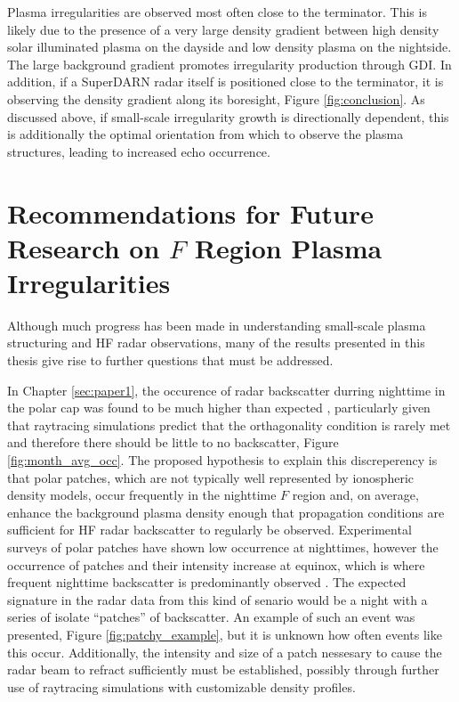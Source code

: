 Plasma irregularities are observed most often close to the terminator.  This is likely due to the presence of a very large density gradient between high density solar illuminated plasma on the dayside and low density plasma on the nightside.  The large background gradient promotes irregularity production through GDI.  In addition, if a SuperDARN radar itself is positioned close to the terminator, it is observing the density gradient along its boresight, Figure \ref{fig:conclusion}.  As discussed above, if small-scale irregularity growth is directionally dependent, this is additionally the optimal orientation from which to observe the plasma structures, leading to increased echo occurrence.


\section{Recommendations for Future Research on \(F\) Region Plasma Irregularities}
\label{sec:futurework}

Although much progress has been made in understanding small-scale plasma structuring and HF radar observations, many of the results presented in this thesis give rise to further questions that must be addressed.

In Chapter \ref{sec:paper1}, the occurence of radar backscatter durring nighttime in the polar cap was found to be much higher than expected \citep{Bristow2011}, particularly given that raytracing simulations predict that the orthagonality condition is rarely met and therefore there should be little to no backscatter, Figure \ref{fig:month_avg_occ}.  The proposed hypothesis to explain this discreperency is that polar patches, which are not typically well represented by ionospheric density models, occur frequently in the nighttime \(F\) region and, on average, enhance the background plasma density enough that propagation conditions are sufficient for HF radar backscatter to regularly be observed.  Experimental surveys of polar patches have shown low occurrence at nighttimes, however the occurrence of patches and their intensity increase at equinox, which is where frequent nighttime backscatter is predominantly observed \citep{Rodger1996}.  The expected signature in the radar data from this kind of senario would be a night with a series of isolate ``patches'' of backscatter.  An example of such an event was presented, Figure \ref{fig:patchy_example}, but it is unknown how often events like this occur.  Additionally, the intensity and size of a patch nessesary to cause the radar beam to refract sufficiently must be established, possibly through further use of raytracing simulations with customizable density profiles.

